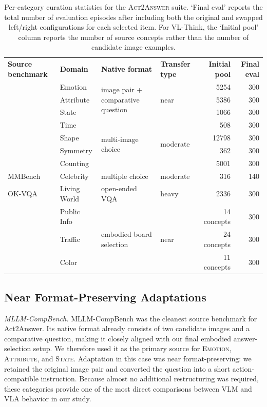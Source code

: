 \documentclass[11pt]{article}
\begin{document}
\begin{table}[h!]
\centering
\small
\begin{tabular}{llllrr}
\toprule
\textbf{Source benchmark} & \textbf{Domain} & \textbf{Native format} & \textbf{Transfer type} & \textbf{Initial pool} & \textbf{Final eval} \\
\addlinespace
\midrule
\addlinespace
\multirow{3}{*}{MLLM-CompBench}& Emotion & \multirow{3}{*}{image pair + comparative question} & \multirow{3}{*}{near} & 5254 & 300 \\ & Attribute & & & 5386 & 300 \\ & State & & & 1066 & 300 \\
\addlinespace
\midrule
\addlinespace
\multirow{4}{*}{IconQA} & Time & \multirow{4}{*}{multi-image choice} & \multirow{4}{*}{moderate} & 508 & 300 \\ & Shape & & & 12798 & 300 \\ & Symmetry  & & & 362 & 300 \\ & Counting  & & & 5001 & 300 \\
\addlinespace
\midrule
\addlinespace
MMBench & Celebrity & multiple choice & moderate & 316 & 140 \\
\midrule
OK-VQA & Living World & open-ended VQA & heavy & 2336 & 300 \\
\addlinespace
\midrule
\addlinespace
\multirow{3}{*}{VL-Think} & Public Info & \multirow{3}{*}{embodied board selection} & \multirow{3}{*}{near} & 14 concepts & 300 \\ & Traffic & & & 24 concepts & 300 \\ & Color & & & 11 concepts & 300 \\
\bottomrule
\end{tabular}
\caption{Per-category curation statistics for the \textsc{Act2Answer} suite. `Final eval' reports the total number of evaluation episodes after including both the original and swapped left/right configurations for each selected item. For VL-Think, the `Initial pool' column reports the number of source concepts rather than the number of candidate image examples.}
\label{tab:appendix_per_category_stats}
\end{table}

\subsection{Near Format-Preserving Adaptations}

\noindent\textit{MLLM-CompBench.}
MLLM-CompBench was the cleanest source benchmark for Act2Answer. Its native format already consists of two candidate images and a comparative question, making it closely aligned with our final embodied answer-selection setup. We therefore used it as the primary source for \textsc{Emotion}, \textsc{Attribute}, and \textsc{State}. Adaptation in this case was near format-preserving: we retained the original image pair and converted the question into a short action-compatible instruction. Because almost no additional restructuring was required, these categories provide one of the most direct comparisons between VLM and VLA behavior in our study.
\end{document}
